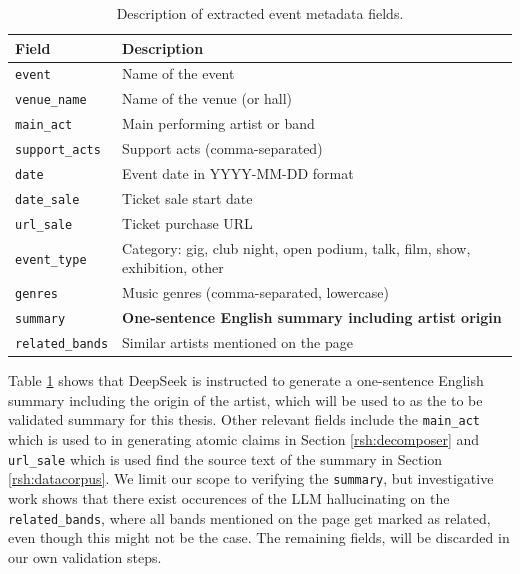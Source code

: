 \newpage
\begin{table}[htpb]
    \centering
    \caption{Description of extracted event metadata fields.}
    \label{tab:metadata_fields}
    \renewcommand{\arraystretch}{1.3} %
    \begin{tabular}{@{} l p{11cm} @{}}
        \toprule
        \textbf{Field} & \textbf{Description} \\
        \midrule
        \texttt{event}          & Name of the event \\
        \texttt{venue\_name}    & Name of the venue (or hall) \\
        \texttt{main\_act}      & Main performing artist or band \\
        \texttt{support\_acts}  & Support acts (comma-separated) \\
        \texttt{date}           & Event date in YYYY-MM-DD format \\
        \texttt{date\_sale}     & Ticket sale start date \\
        \texttt{url\_sale}      & Ticket purchase URL \\
        \texttt{event\_type}    & Category: gig, club night, open podium, talk, film, show, exhibition, other \\
        \texttt{genres}         & Music genres (comma-separated, lowercase) \\
        \texttt{summary}        & \textbf{One-sentence English summary including artist origin} \\
        \texttt{related\_bands} & Similar artists mentioned on the page \\
        \bottomrule
    \end{tabular}
\end{table}

\noindent Table \ref{tab:metadata_fields} shows that DeepSeek is instructed to generate a one-sentence English summary including the origin of the artist, which will be used to as the to be validated summary for this thesis. Other relevant fields include the \texttt{main\_act} which is used to in generating atomic claims in Section \ref{rsh:decomposer} and \texttt{url\_sale} which is used find the source text of the summary in Section \ref{rsh:datacorpus}. We limit our scope to verifying the \texttt{summary}, but investigative work shows that there exist occurences of the LLM hallucinating on the \texttt{related\_bands}, where all bands mentioned on the page get marked as related, even though this might not be the case. The remaining fields, will be discarded in our own validation steps. 

